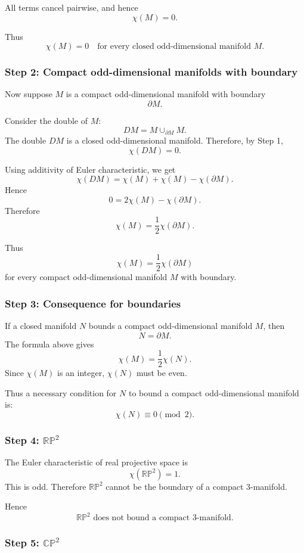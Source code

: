\documentclass[12pt,a4paper]{article}
\theoremstyle{notespace}
\begin{document}
All terms cancel pairwise, and hence
\[
\chi(M)=0.
\]

Thus
\[
\boxed{
	\chi(M)=0
	\quad
	\text{for every closed odd-dimensional manifold }M.
}
\]

\subsubsection*{Step 2: Compact odd-dimensional manifolds with boundary}

Now suppose \(M\) is a compact odd-dimensional manifold with boundary
\[
\partial M.
\]

Consider the double of \(M\):
\[
DM=M\cup_{\partial M} M.
\]
The double \(DM\) is a closed odd-dimensional manifold. Therefore, by Step 1,
\[
\chi(DM)=0.
\]

Using additivity of Euler characteristic, we get
\[
\chi(DM)
=
\chi(M)+\chi(M)-\chi(\partial M).
\]
Hence
\[
0=2\chi(M)-\chi(\partial M).
\]
Therefore
\[
\chi(M)=\frac{1}{2}\chi(\partial M).
\]

Thus
\[
\boxed{
	\chi(M)=\frac{1}{2}\chi(\partial M)
}
\]
for every compact odd-dimensional manifold \(M\) with boundary.

\subsubsection*{Step 3: Consequence for boundaries}

If a closed manifold \(N\) bounds a compact odd-dimensional manifold \(M\), then
\[
N=\partial M.
\]
The formula above gives
\[
\chi(M)=\frac{1}{2}\chi(N).
\]
Since \(\chi(M)\) is an integer, \(\chi(N)\) must be even.

Thus a necessary condition for \(N\) to bound a compact odd-dimensional manifold
is:
\[
\chi(N)\equiv 0\pmod 2.
\]

\subsubsection*{Step 4: \(\mathbb{RP}^2\)}

The Euler characteristic of real projective space is
\[
\chi(\mathbb{RP}^{2})=1.
\]
This is odd. Therefore \(\mathbb{RP}^2\) cannot be the boundary of a compact
\(3\)-manifold.

Hence
\[
\boxed{
	\mathbb{RP}^2
	\text{ does not bound a compact }3\text{-manifold.}
}
\]

\subsubsection*{Step 5: \(\mathbb{CP}^2\)}
\end{document}
